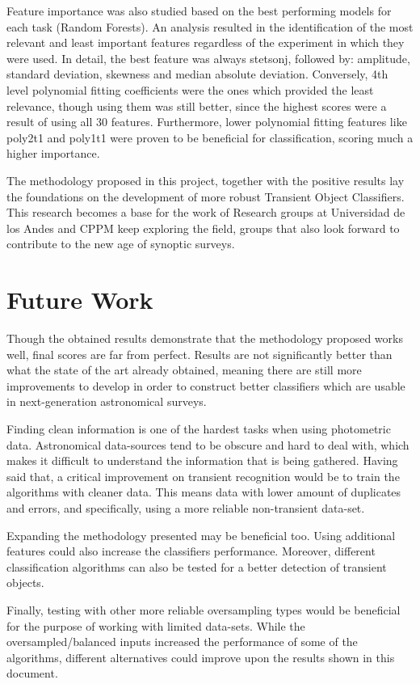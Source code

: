 Feature importance was also studied based on the best performing models for each task (Random Forests). An analysis resulted in the identification of the most relevant and least important features regardless of the experiment in which they were used. In detail, the best feature was always stetson\textunderscore j, followed by: amplitude, standard deviation, skewness and median absolute deviation. Conversely, 4th level polynomial fitting coefficients were the ones which provided the least relevance, though using them was still better, since the highest scores were a result of using all 30 features. Furthermore, lower polynomial fitting features like poly2\textunderscore t1 and poly1\textunderscore t1 were proven to be beneficial for classification, scoring much a higher importance.

The methodology proposed in this project, together with the positive results lay the foundations on the development of more robust Transient Object Classifiers. This research becomes a base for the work of Research groups at Universidad de los Andes and CPPM keep exploring the field, groups that also look forward to contribute to the new age of synoptic surveys.



\section{Future Work} \label{future_work}

Though the obtained results demonstrate that the methodology proposed works well, final scores are far from perfect. Results are not significantly better than what the state of the art already obtained, meaning there are still more improvements to develop in order to construct better classifiers which are usable in next-generation astronomical surveys. 

Finding clean information is one of the hardest tasks when using photometric data. Astronomical data-sources tend to be obscure and hard to deal with, which makes it difficult to understand the information that is being gathered. Having said that, a critical improvement on transient recognition would be to train the algorithms with cleaner data. This means data with lower amount of duplicates and errors, and specifically, using a more reliable non-transient data-set. 

Expanding the methodology presented may be beneficial too. Using additional features could also increase the classifiers performance. Moreover, different classification algorithms can also be tested for a better detection of transient objects.

Finally, testing with other more reliable oversampling types would be beneficial for the purpose of working with limited data-sets. While the oversampled/balanced inputs increased the performance of some of the algorithms, different alternatives could improve upon the results shown in this document.
